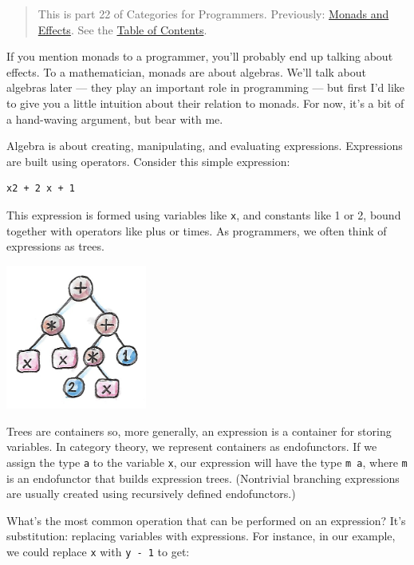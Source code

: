 \begin{quote}
This is part 22 of Categories for Programmers. Previously:
\href{https://bartoszmilewski.com/2016/11/30/monads-and-effects/}{Monads
and Effects}. See the
\href{https://bartoszmilewski.com/2014/10/28/category-theory-for-programmers-the-preface/}{Table
of Contents}.
\end{quote}

If you mention monads to a programmer, you'll probably end up talking
about effects. To a mathematician, monads are about algebras. We'll talk
about algebras later --- they play an important role in programming ---
but first I'd like to give you a little intuition about their relation
to monads. For now, it's a bit of a hand-waving argument, but bear with
me.

Algebra is about creating, manipulating, and evaluating expressions.
Expressions are built using operators. Consider this simple expression:

\begin{verbatim}
x2 + 2 x + 1
\end{verbatim}

This expression is formed using variables like \texttt{x}, and constants
like 1 or 2, bound together with operators like plus or times. As
programmers, we often think of expressions as trees.

\includegraphics[width=1.82292in]{images/exptree.png}

Trees are containers so, more generally, an expression is a container
for storing variables. In category theory, we represent containers as
endofunctors. If we assign the type \texttt{a} to the variable
\texttt{x}, our expression will have the type \texttt{m\ a}, where
\texttt{m} is an endofunctor that builds expression trees. (Nontrivial
branching expressions are usually created using recursively defined
endofunctors.)

What's the most common operation that can be performed on an expression?
It's substitution: replacing variables with expressions. For instance,
in our example, we could replace \texttt{x} with \texttt{y\ -\ 1} to
get:

